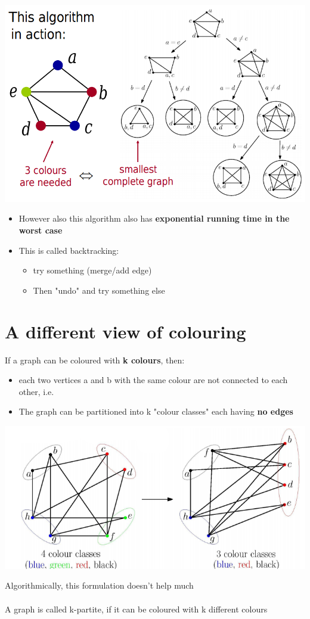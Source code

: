 \documentclass{article}[18pt]
\begin{document}
\begin{center}
\includegraphics[scale=0.7]{inAction}
\end{center}
\begin{itemize}
\item However also this algorithm also has \textbf{exponential running time in the worst case}
\item This is called backtracking:
\begin{itemize}
\item try something (merge/add edge)
\item Then "undo" and try something else
\end{itemize}
\end{itemize}
\section{A different view of colouring}
If a graph can be coloured with \textbf{k colours}, then:
\begin{itemize}
\item each two vertices a and b with the same colour are not connected to each other, i.e.
\item The graph can be partitioned into k "colour classes" each having \textbf{no edges}
\end{itemize}
\begin{center}
\includegraphics[scale=0.7]{classes}
\end{center}
Algorithmically, this formulation doesn't help much\\
\\
A graph is called k-partite, if it can be coloured with k different colours
\end{document}
